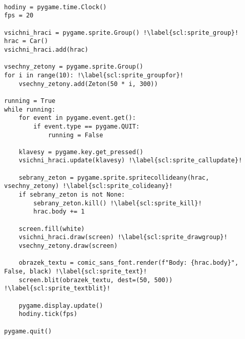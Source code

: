 \begin{minipage}[t]{.45\textwidth}
\begin{code}
\begin{verbatim}
        
hodiny = pygame.time.Clock()
fps = 20

vsichni_hraci = pygame.sprite.Group() !\label{scl:sprite_group}!
hrac = Car()
vsichni_hraci.add(hrac)

vsechny_zetony = pygame.sprite.Group()
for i in range(10): !\label{scl:sprite_groupfor}!
    vsechny_zetony.add(Zeton(50 * i, 300))

running = True
while running:
    for event in pygame.event.get():
        if event.type == pygame.QUIT:
            running = False
    
    klavesy = pygame.key.get_pressed() 
    vsichni_hraci.update(klavesy) !\label{scl:sprite_callupdate}!
    
    sebrany_zeton = pygame.sprite.spritecollideany(hrac, vsechny_zetony) !\label{scl:sprite_colideany}!
    if sebrany_zeton is not None:
        sebrany_zeton.kill() !\label{scl:sprite_kill}!
        hrac.body += 1
    
    screen.fill(white)
    vsichni_hraci.draw(screen) !\label{scl:sprite_drawgroup}!
    vsechny_zetony.draw(screen)
    
    obrazek_textu = comic_sans_font.render(f"Body: {hrac.body}", False, black) !\label{scl:sprite_text}!
    screen.blit(obrazek_textu, dest=(50, 500)) !\label{scl:sprite_textblit}!
    
    pygame.display.update()
    hodiny.tick(fps)

pygame.quit()
\end{verbatim}

\label{code:grafika_Sprite2}
\end{code}
\end{minipage}
